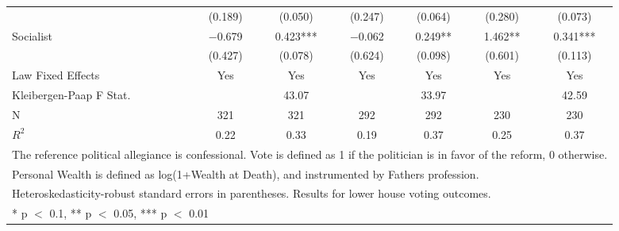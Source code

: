 \begin{table}
\begin{tabular}[t]{lcccccc}
 & (\num{0.189}) & (\num{0.050}) & (\num{0.247}) & (\num{0.064}) & (\num{0.280}) & (\num{0.073})\\
Socialist & \num{-0.679} & \num{0.423}*** & \num{-0.062} & \num{0.249}** & \num{1.462}** & \num{0.341}***\\
 & (\num{0.427}) & (\num{0.078}) & (\num{0.624}) & (\num{0.098}) & (\num{0.601}) & (\num{0.113})\\
\midrule
Law Fixed Effects & Yes & Yes & Yes & Yes & Yes & Yes\\
Kleibergen-Paap F Stat. &  & 43.07 &  & 33.97 &  & 42.59\\
N & \num{321} & \num{321} & \num{292} & \num{292} & \num{230} & \num{230}\\
$R^2$ & \num{0.22} & \num{0.33} & \num{0.19} & \num{0.37} & \num{0.25} & \num{0.37}\\
\bottomrule
\multicolumn{7}{l}{\rule{0pt}{1em}The reference political allegiance is confessional. Vote is defined as 1 if the politician is in favor of the reform, 0 otherwise.}\\
\multicolumn{7}{l}{\rule{0pt}{1em}Personal Wealth is defined as log(1+Wealth at Death), and instrumented by Fathers profession.}\\
\multicolumn{7}{l}{\rule{0pt}{1em}Heteroskedasticity-robust standard errors in parentheses. Results for lower house voting outcomes.}\\
\multicolumn{7}{l}{\rule{0pt}{1em}* p $<$ 0.1, ** p $<$ 0.05, *** p $<$ 0.01}\\
\end{tabular}
\end{table}

